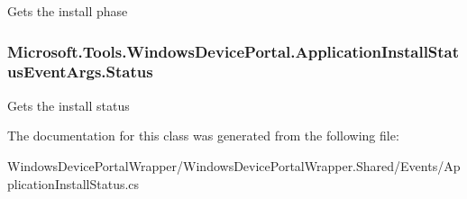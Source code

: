 Gets the install phase 

\subsubsection[{\texorpdfstring{Status}{Status}}]{ Microsoft.\+Tools.\+Windows\+Device\+Portal.\+Application\+Install\+Status\+Event\+Args.\+Status\hspace{0.3cm}{\ttfamily [get]}}\hypertarget{class_microsoft_1_1_tools_1_1_windows_device_portal_1_1_application_install_status_event_args_af184dcd51a0bfe8cdc2464c9422afa8e}{}\label{class_microsoft_1_1_tools_1_1_windows_device_portal_1_1_application_install_status_event_args_af184dcd51a0bfe8cdc2464c9422afa8e}


Gets the install status 



The documentation for this class was generated from the following file\+:\begin{DoxyCompactItemize}
\item 
Windows\+Device\+Portal\+Wrapper/\+Windows\+Device\+Portal\+Wrapper.\+Shared/\+Events/Application\+Install\+Status.\+cs\end{DoxyCompactItemize}
